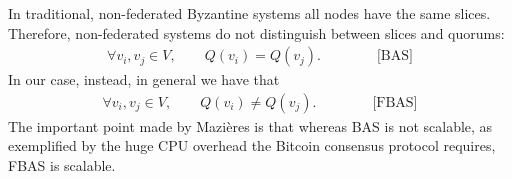 In traditional, non-federated Byzantine systems all nodes have the same slices. Therefore, non-federated systems do not distinguish between slices and quorums:
\begin{align}
\forall v_i, v_j \in V, \qquad Q(v_i) = Q(v_j). \qquad\qquad \text{[BAS]} 
\end{align}
In our case, instead, in general we have that
\begin{align}
\forall v_i, v_j \in V, \qquad Q(v_i) \ne Q(v_j). \qquad\qquad \text{[FBAS]} 
\end{align}
The important point made by Mazi\`eres is that whereas BAS is not scalable, as exemplified by the huge CPU overhead the Bitcoin consensus protocol requires, FBAS is scalable.

\begin{center}
\small
{}
\end{center}

